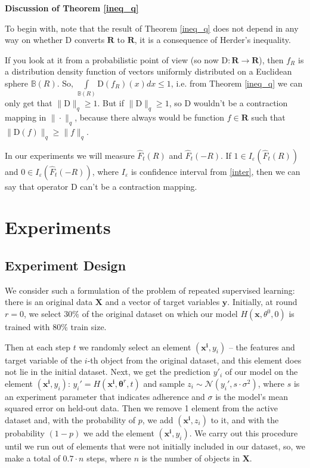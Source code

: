 \documentclass{article}
\begin{document}
    \textbf{Discussion of Theorem \ref{ineq_q}}

    To begin with, note that the result of Theorem \ref{ineq_q} does not depend in any way on whether $\text{D}$ converts $\mathbf{R}$ to $\mathbf{R}$, it is a consequence of Herder's inequality. 
    
    If you look at it from a probabilistic point of view (so now $\text{D} : \mathbf{R} \to \mathbf{R}$), then $f_R$ is a distribution density function of vectors uniformly distributed on a Euclidean sphere $\mathbb{B}(R)$. So, $\int\limits_{\mathbb{B}(R)} \text{D}(f_R)(x)dx \leq 1$, i.e. from Theorem \ref{ineq_q} we can only get that $\|\text{D}\|_q \geq 1$. But if $\|\text{D}\|_q \geq 1$, so $\text{D}$ wouldn't be a contraction mapping in $\|\cdot\|_q$, because there always would be function $f \in \mathbf{R}$ such that $\|\text{D}(f)\|_q \geq \|f\|_q$.

    In our experiments we will measure $\hat{F}_t(R)$ and $\hat{F}_t(-R)$. If $1 \in I_{\varepsilon}(\hat{F}_t(R))$ and $0 \in I_{\varepsilon}(\hat{F}_t(-R))$, where $I_{\varepsilon}$ is confidence interval from \eqref{inter}, then we can say that operator $\text{D}$ can't be a contraction mapping.

\section{Experiments} \label{Experiments}

    \subsection{Experiment Design} \label{design}
        We consider such a formulation of the problem of repeated supervised learning: there is an original data $\textbf{X}$ and a vector of target variables $\mathbf{y}$. Initially, at round $r = 0$, we select $30\%$ of the original dataset on which our model $H(\mathbf{x}, \theta^0, 0)$ is trained with $80\%$ train size. 
        
        Then at each step $t$ we randomly select an element $(\mathbf{x^i}, y_i)$ -- the features and target variable of the $i$-th object from the original dataset, and this element does not lie in the initial dataset. Next, we get the prediction $y'_i$ of our model on the element $(\mathbf{x^i}, y_i)$: $y_i'=H(\mathbf{x^i}, \mathbf{\theta}^r, t)$ and sample $z_i \sim \mathcal{N}(y_i', s \cdot \sigma^2)$, where $s$ is an experiment parameter that indicates adherence and $\sigma$ is the model's mean squared error on held-out data. Then we remove 1 element from the active dataset and, with the probability of $p$, we add $(\mathbf{x^i}, z_i)$ to it, and with the probability $(1-p)$ we add the element $(\mathbf{x^i}, y_i)$. We carry out this procedure until we run out of elements that were not initially included in our dataset, so, we make a total of $0.7 \cdot n$ steps, where $n$ is the number of objects in $\textbf{X}$.
\end{document}
